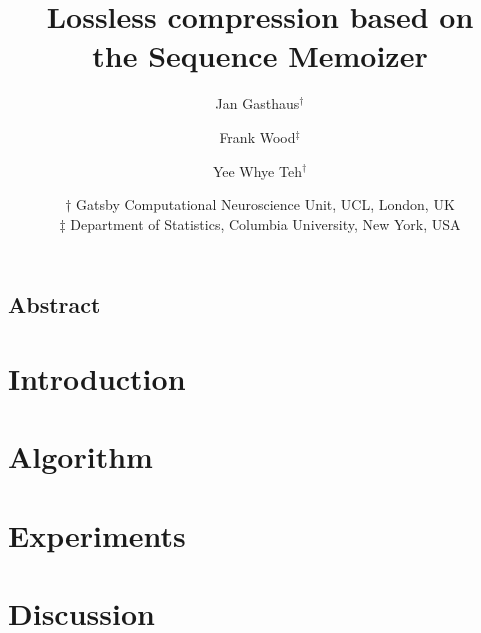 \documentclass[oneside,letterpaper,12pt]{article}
\title{Lossless compression based on\\the Sequence Memoizer}
\author{Jan Gasthaus$^\dagger$ \and Frank Wood$^\ddagger$ \and Yee Whye
Teh$^\dagger$
}
\date{
\small
 $\dagger$ Gatsby Computational Neuroscience Unit, UCL, London, UK\\
 $\ddagger$ Department of Statistics, Columbia University, New York, USA}
\begin{document}
\maketitle
\subsection*{Abstract}


\section{Introduction}


\section{Algorithm}






\section{Experiments}


%

\section{Discussion}



\renewcommand{\bibsection}{\subsubsection*{References}}
\setlength{\bibsep}{0mm}


\end{document}
